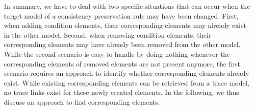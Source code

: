 In summary, we have to deal with two specific situations that can occur when the target model of a consistency preservation rule may have been changed.
First, when adding condition elements, their corresponding elements may already exist in the other model.
Second, when removing condition elements, their corresponding elements may have already been removed from the other model.
While the second scenario is easy to handle by doing nothing whenever the corresponding elements of removed elements are not present anymore, the first scenario requires an approach to identify whether corresponding elements already exist.
While existing corresponding elements can be retrieved from a trace model, no trace links exist for these newly created elements.
In the following, we thus discuss an approach to find corresponding elements.




